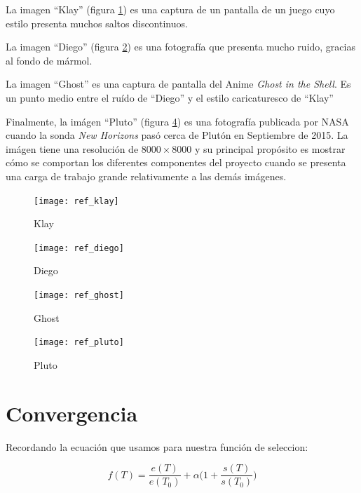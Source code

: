 La imagen ``Klay'' (figura \ref{fig:ref-klay}) es una captura de un pantalla de
un juego cuyo estilo presenta muchos saltos discontinuos.

La imagen ``Diego'' (figura \ref{fig:ref-diego}) es una fotografía que presenta
mucho ruido, gracias al fondo de mármol.

La imagen ``Ghost'' es una captura de pantalla del Anime \emph{Ghost in the
Shell}. Es un punto medio entre el ruído de ``Diego'' y el estilo caricaturesco
de ``Klay''

Finalmente, la imágen ``Pluto'' (figura \ref{fig:ref-pluto}) es una fotografía
publicada por NASA cuando la sonda \emph{New Horizons} pasó cerca de Plutón en
Septiembre de 2015. La imágen tiene una resolución de $8000\times8000$ y su
principal propósito es mostrar cómo se comportan los diferentes componentes del
proyecto cuando se presenta una carga de trabajo grande relativamente a las
demás imágenes.

\begin{figure}[b]
    \texttt{[image: ref\_klay]}
    \caption{Klay}
    \label{fig:ref-klay}
\end{figure}

\begin{figure}[b]
    \texttt{[image: ref\_diego]}
    \caption{Diego}
    \label{fig:ref-diego}
\end{figure}

\begin{figure}[b]
    \texttt{[image: ref\_ghost]}
    \caption{Ghost}
    \label{fig:ref-ghost}
\end{figure}

\begin{figure}[b]
    \texttt{[image: ref\_pluto]}
    \caption{Pluto}
    \label{fig:ref-pluto}
\end{figure}


\section{Convergencia}

Recordando la ecuación que usamos para nuestra función de seleccion:

\begin{equation}
f(T) = \frac{e(T)}{e(T_0)} + \alpha \Big(1 + \frac{s(T)}{s(T_0)}\Big)
\end{equation}\label{eq:fitness-repeated}

